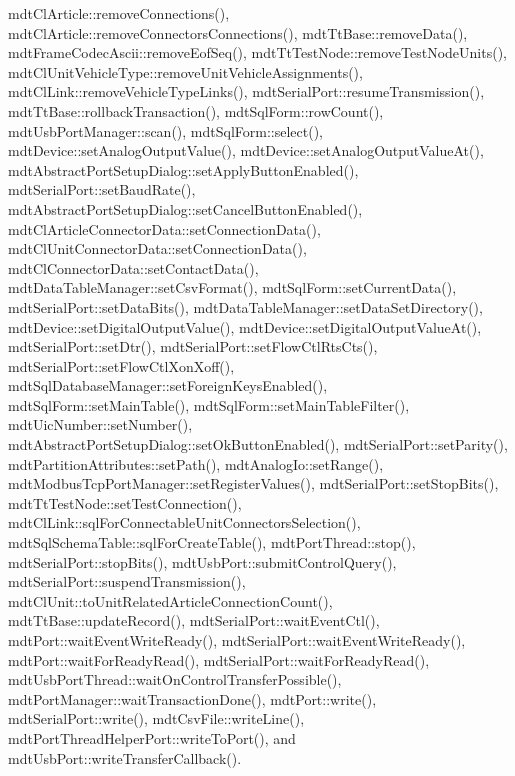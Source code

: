 mdt\-Cl\-Article\-::remove\-Connections(), mdt\-Cl\-Article\-::remove\-Connectors\-Connections(), mdt\-Tt\-Base\-::remove\-Data(), mdt\-Frame\-Codec\-Ascii\-::remove\-Eof\-Seq(), mdt\-Tt\-Test\-Node\-::remove\-Test\-Node\-Units(), mdt\-Cl\-Unit\-Vehicle\-Type\-::remove\-Unit\-Vehicle\-Assignments(), mdt\-Cl\-Link\-::remove\-Vehicle\-Type\-Links(), mdt\-Serial\-Port\-::resume\-Transmission(), mdt\-Tt\-Base\-::rollback\-Transaction(), mdt\-Sql\-Form\-::row\-Count(), mdt\-Usb\-Port\-Manager\-::scan(), mdt\-Sql\-Form\-::select(), mdt\-Device\-::set\-Analog\-Output\-Value(), mdt\-Device\-::set\-Analog\-Output\-Value\-At(), mdt\-Abstract\-Port\-Setup\-Dialog\-::set\-Apply\-Button\-Enabled(), mdt\-Serial\-Port\-::set\-Baud\-Rate(), mdt\-Abstract\-Port\-Setup\-Dialog\-::set\-Cancel\-Button\-Enabled(), mdt\-Cl\-Article\-Connector\-Data\-::set\-Connection\-Data(), mdt\-Cl\-Unit\-Connector\-Data\-::set\-Connection\-Data(), mdt\-Cl\-Connector\-Data\-::set\-Contact\-Data(), mdt\-Data\-Table\-Manager\-::set\-Csv\-Format(), mdt\-Sql\-Form\-::set\-Current\-Data(), mdt\-Serial\-Port\-::set\-Data\-Bits(), mdt\-Data\-Table\-Manager\-::set\-Data\-Set\-Directory(), mdt\-Device\-::set\-Digital\-Output\-Value(), mdt\-Device\-::set\-Digital\-Output\-Value\-At(), mdt\-Serial\-Port\-::set\-Dtr(), mdt\-Serial\-Port\-::set\-Flow\-Ctl\-Rts\-Cts(), mdt\-Serial\-Port\-::set\-Flow\-Ctl\-Xon\-Xoff(), mdt\-Sql\-Database\-Manager\-::set\-Foreign\-Keys\-Enabled(), mdt\-Sql\-Form\-::set\-Main\-Table(), mdt\-Sql\-Form\-::set\-Main\-Table\-Filter(), mdt\-Uic\-Number\-::set\-Number(), mdt\-Abstract\-Port\-Setup\-Dialog\-::set\-Ok\-Button\-Enabled(), mdt\-Serial\-Port\-::set\-Parity(), mdt\-Partition\-Attributes\-::set\-Path(), mdt\-Analog\-Io\-::set\-Range(), mdt\-Modbus\-Tcp\-Port\-Manager\-::set\-Register\-Values(), mdt\-Serial\-Port\-::set\-Stop\-Bits(), mdt\-Tt\-Test\-Node\-::set\-Test\-Connection(), mdt\-Cl\-Link\-::sql\-For\-Connectable\-Unit\-Connectors\-Selection(), mdt\-Sql\-Schema\-Table\-::sql\-For\-Create\-Table(), mdt\-Port\-Thread\-::stop(), mdt\-Serial\-Port\-::stop\-Bits(), mdt\-Usb\-Port\-::submit\-Control\-Query(), mdt\-Serial\-Port\-::suspend\-Transmission(), mdt\-Cl\-Unit\-::to\-Unit\-Related\-Article\-Connection\-Count(), mdt\-Tt\-Base\-::update\-Record(), mdt\-Serial\-Port\-::wait\-Event\-Ctl(), mdt\-Port\-::wait\-Event\-Write\-Ready(), mdt\-Serial\-Port\-::wait\-Event\-Write\-Ready(), mdt\-Port\-::wait\-For\-Ready\-Read(), mdt\-Serial\-Port\-::wait\-For\-Ready\-Read(), mdt\-Usb\-Port\-Thread\-::wait\-On\-Control\-Transfer\-Possible(), mdt\-Port\-Manager\-::wait\-Transaction\-Done(), mdt\-Port\-::write(), mdt\-Serial\-Port\-::write(), mdt\-Csv\-File\-::write\-Line(), mdt\-Port\-Thread\-Helper\-Port\-::write\-To\-Port(), and mdt\-Usb\-Port\-::write\-Transfer\-Callback().

